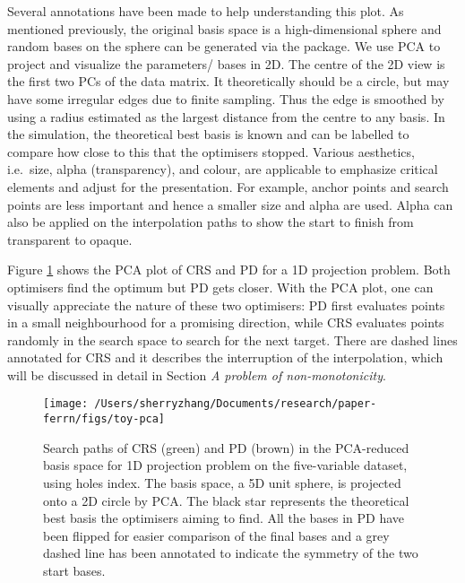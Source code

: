 Several annotations have been made to help understanding this plot. As
mentioned previously, the original basis space is a high-dimensional
sphere and random bases on the sphere can be generated via the
 \citep{geozoo} package. We use PCA to project and
visualize the parameters/ bases in 2D. The centre of the 2D view is the
first two PCs of the data matrix. It theoretically should be a circle,
but may have some irregular edges due to finite sampling. Thus the edge
is smoothed by using a radius estimated as the largest distance from the
centre to any basis. In the simulation, the theoretical best basis is
known and can be labelled to compare how close to this that the
optimisers stopped. Various aesthetics, i.e.~size, alpha (transparency),
and colour, are applicable to emphasize critical elements and adjust for
the presentation. For example, anchor points and search points are less
important and hence a smaller size and alpha are used. Alpha can also be
applied on the interpolation paths to show the start to finish from
transparent to opaque.

Figure \ref{fig:toy-pca} shows the PCA plot of CRS and PD for a 1D
projection problem. Both optimisers find the optimum but PD gets closer.
With the PCA plot, one can visually appreciate the nature of these two
optimisers: PD first evaluates points in a small neighbourhood for a
promising direction, while CRS evaluates points randomly in the search
space to search for the next target. There are dashed lines annotated
for CRS and it describes the interruption of the interpolation, which
will be discussed in detail in Section \emph{A problem of
non-monotonicity}.

\begin{Schunk}
\begin{figure}

{\centering \texttt{[image: /Users/sherryzhang/Documents/research/paper-ferrn/figs/toy-pca]} 

}

\caption[Search paths of CRS (green) and PD (brown) in the PCA-reduced basis space for 1D projection problem on the five-variable dataset,  using holes index]{Search paths of CRS (green) and PD (brown) in the PCA-reduced basis space for 1D projection problem on the five-variable dataset,  using holes index. The basis space, a 5D unit sphere, is projected onto a 2D circle by PCA. The black star represents the theoretical best basis the optimisers aiming to find. All the bases in PD have been flipped for easier comparison of the final bases and a grey dashed line has been annotated to indicate the symmetry of the two start bases.}\label{fig:toy-pca}
\end{figure}
\end{Schunk}


